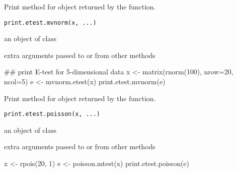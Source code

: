 \documentclass{article}
\begin{document}
\begin{Description}\relax
Print method for  object returned by the 
 function.
\end{Description}
\begin{Usage}
\begin{verbatim}
print.etest.mvnorm(x, ...)
\end{verbatim}
\end{Usage}
\begin{Arguments}
\begin{ldescription}
\item[\code{x}] an object of class  
\item[\code{...}] extra arguments passed to or from other methods 
\end{ldescription}
\end{Arguments}
\begin{SeeAlso}\relax
{}
\end{SeeAlso}
\begin{Examples}
\begin{ExampleCode}
 ## print E-test for 5-dimensional data
 x <- matrix(rnorm(100), nrow=20, ncol=5)
 e <- mvnorm.etest(x)
 print.etest.mvnorm(e)
 \end{ExampleCode}
\end{Examples}

\begin{Description}\relax
Print method for  object returned by the 
 function.
\end{Description}
\begin{Usage}
\begin{verbatim}
print.etest.poisson(x, ...)
\end{verbatim}
\end{Usage}
\begin{Arguments}
\begin{ldescription}
\item[\code{x}] an object of class  
\item[\code{...}] extra arguments passed to or from other methods 
\end{ldescription}
\end{Arguments}
\begin{SeeAlso}\relax
{}
\end{SeeAlso}
\begin{Examples}
\begin{ExampleCode}
 x <- rpois(20, 1)
 e <- poisson.mtest(x)
 print.etest.poisson(e)
 \end{ExampleCode}
\end{Examples}
\end{document}
